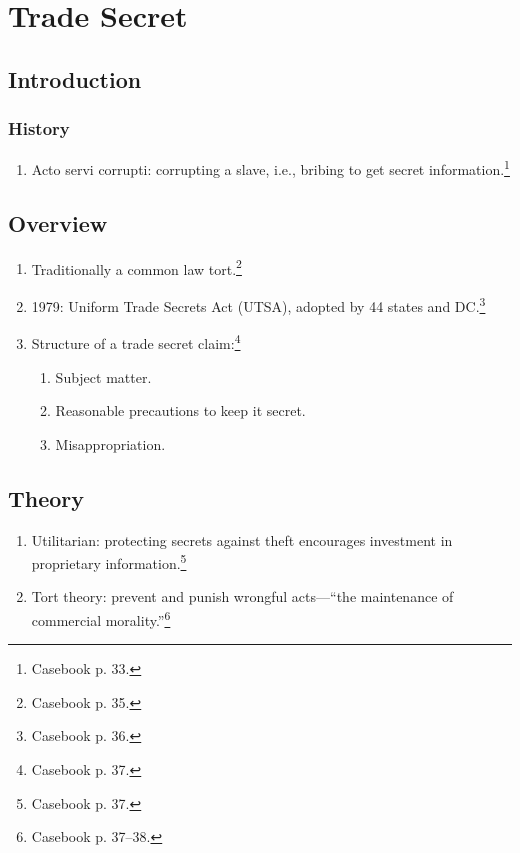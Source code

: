\section{Trade Secret}

\subsection{Introduction}

\subsubsection{History}

\begin{enumerate}
    \item Acto servi corrupti: corrupting a slave, i.e., bribing to get secret 
    information.\footnote{Casebook p. 33.}
\end{enumerate}

\subsection{Overview}

\begin{enumerate}
    \item Traditionally a common law tort.\footnote{Casebook p. 35.}
    \item 1979: Uniform Trade Secrets Act (UTSA), adopted by 44 states and 
    DC.\footnote{Casebook p. 36.}
    \item Structure of a trade secret claim:\footnote{Casebook p. 37.
    }
    \begin{enumerate}
        \item Subject matter.
        \item Reasonable precautions to keep it secret.
        \item Misappropriation.
    \end{enumerate}
\end{enumerate}

\subsection{Theory}

\begin{enumerate}
    \item Utilitarian: protecting secrets against theft encourages investment 
    in proprietary information.\footnote{Casebook p. 37.}
    \item Tort theory: prevent and punish wrongful acts---``the maintenance of 
    commercial morality.''\footnote{Casebook p.  37--38.}
\end{enumerate}

